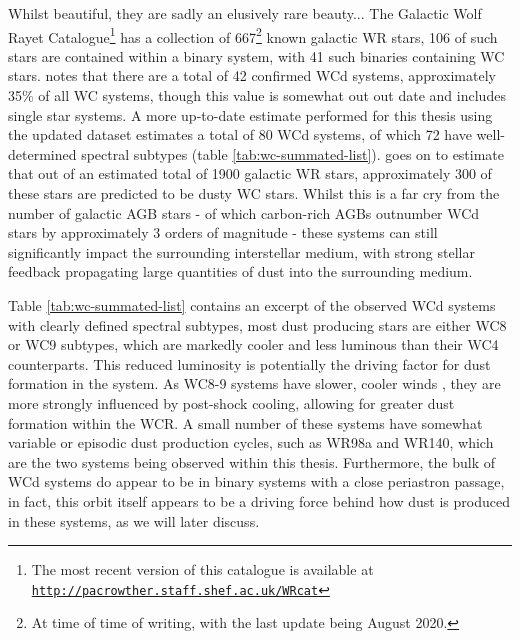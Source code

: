 Whilst beautiful, they are sadly an elusively rare beauty...
The Galactic Wolf Rayet Catalogue\footnote{The most recent version of this catalogue is available at \texttt{\href{http://pacrowther.staff.shef.ac.uk/WRcat}{http://pacrowther.staff.shef.ac.uk/WRcat}}} \parencite{rossloweSpatialDistributionGalactic2015} has a collection of 667\footnote{At time of time of writing, with the last update being August 2020.} known galactic WR stars, 106 of such stars are contained within a binary system, with 41 such binaries containing WC stars.
\textcite{rossloweSpatialDistributionGalactic2015} notes that there are a total of 42 confirmed WCd systems, approximately 35\% of all WC systems, though this value is somewhat out out date and includes single star systems.
A more up-to-date estimate performed for this thesis using the updated dataset estimates a total of 80 WCd systems, of which 72 have well-determined spectral subtypes (table \ref{tab:wc-summated-list}).
\textcite{rossloweSpatialDistributionGalactic2015} goes on to estimate that out of an estimated total of 1900 galactic WR stars, approximately 300 of these stars are predicted to be dusty WC stars.
Whilst this is a far cry from the number of galactic AGB stars - of which carbon-rich AGBs outnumber WCd stars by approximately 3 orders of magnitude \parencite{ishiharaGalacticDistributionsCarbon2011} - these systems can still significantly impact the surrounding interstellar medium, with strong stellar feedback propagating large quantities of dust into the surrounding medium.

Table \ref{tab:wc-summated-list} contains an excerpt of the observed WCd systems with clearly defined spectral subtypes, most dust producing stars are either WC8 or WC9 subtypes, which are markedly cooler and less luminous than their WC4 counterparts.
This reduced luminosity is potentially the driving factor for dust formation in the system.
As WC8-9 systems have slower, cooler winds \parencite{niedzielskiKinematicalStructureWolfRayet2002}, they are more strongly influenced by post-shock cooling, allowing for greater dust formation within the WCR.
A small number of these systems have somewhat variable or episodic dust production cycles, such as WR98a and WR140, which are the two systems being observed within this thesis.
Furthermore, the bulk of WCd systems do appear to be in binary systems with a close periastron passage, in fact, this orbit itself appears to be a driving force behind how dust is produced in these systems, as we will later discuss.

